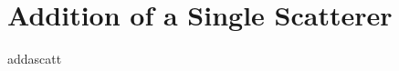\documentclass[12pt,a4paper,titlepage,onecolumn]{report}
\begin{document}
\section{Addition of a Single Scatterer}
{addascatt}
\end{document}
